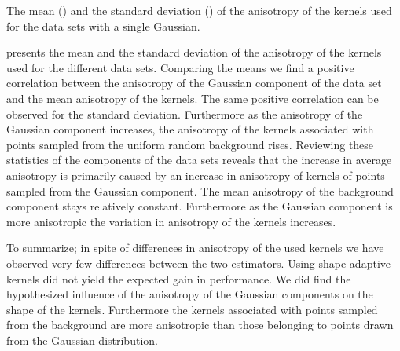 	\begin{table}
		\centering
		
		\caption{The mean (\mean) and the standard deviation (\SD) of the anisotropy of the kernels used for the data sets with a single Gaussian.}
		\label{tab:results:singleSphere:anisotropy}
	\end{table}
	 presents the mean and the standard deviation of the anisotropy of the kernels used for the different data sets. Comparing the means we find a positive correlation between the anisotropy of the Gaussian component of the data set and the mean anisotropy of the kernels. The same positive correlation can be observed for the standard deviation. Furthermore as the anisotropy of the Gaussian component increases, the anisotropy of the kernels associated with points sampled from the uniform random background rises.
	Reviewing these statistics of the components of the data sets reveals that the increase in average anisotropy is primarily caused by an increase in anisotropy of kernels of points sampled from the Gaussian component. The mean anisotropy of the background component stays relatively constant. Furthermore as the Gaussian component is more anisotropic the variation in anisotropy of the kernels increases.

To summarize; in spite of differences in anisotropy of the used kernels we have observed very few differences between the two estimators. Using shape-adaptive kernels did not yield the expected gain in performance. We did find the hypothesized influence of the anisotropy of the Gaussian components on the shape of the kernels. Furthermore the kernels associated with points sampled from the background are more anisotropic than those belonging to points drawn from the Gaussian distribution.
